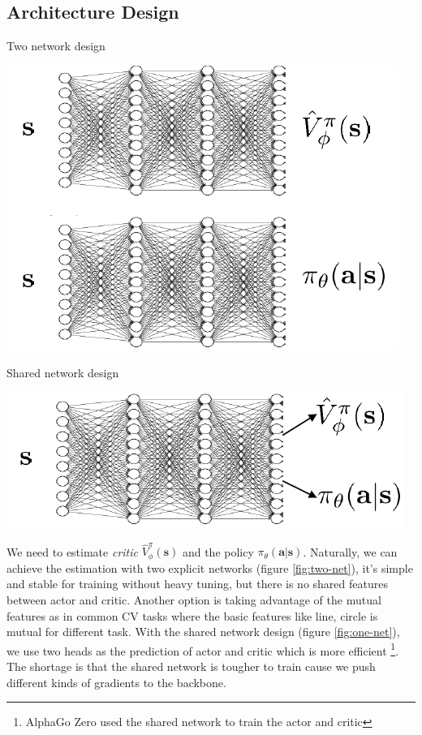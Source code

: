 \documentclass{tufte-handout}
\newcommand{\s}{\mathbf{s}}
\newcommand{\act}{\mathbf{a}}
\begin{document}
\subsection{Architecture Design}
\begin{marginfigure}
\caption{Two network design}
\includegraphics[width=\linewidth]{two-net}
\label{fig:two-net}
\end{marginfigure}

\begin{marginfigure}
\caption{Shared network design}
\includegraphics[width=\linewidth]{one-net}
\label{fig:one-net}
\end{marginfigure}

We need to estimate \emph{critic} $\hat{V}_\phi ^ \pi (\s)$ and the policy $\pi_\theta(\act | \s)$. Naturally, we can achieve the estimation with two explicit networks (figure \ref{fig:two-net}), it's simple and stable for training without heavy tuning, but there is no shared features between actor and
critic. Another option is taking advantage of the mutual features as in common CV tasks where the basic features like line, circle is mutual for different task. With the shared network design (figure \ref{fig:one-net}), we use two heads as the prediction of actor and critic which is more efficient \thanks{AlphaGo Zero used the shared network to train the actor and critic}. The shortage is that the shared network is tougher to train cause we push different kinds of gradients to the backbone.
\end{document}
